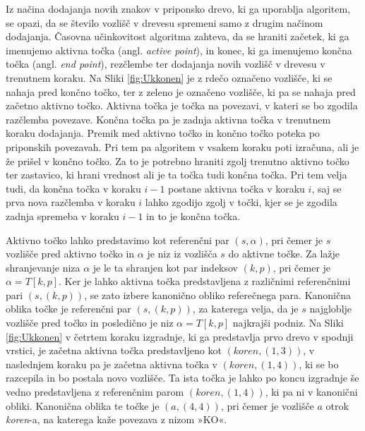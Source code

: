 Iz načina dodajanja novih znakov v priponsko drevo, ki ga uporablja algoritem, se opazi, da se število vozlišč v drevesu spremeni samo z drugim načinom dodajanja. Časovna učinkovitost algoritma zahteva, da se hraniti začetek, ki ga imenujemo aktivna točka (angl. \textit{active point}),  in konec, ki ga imenujemo končna točka (angl. \textit{end point}), rezčlembe ter dodajanja novih vozlišč v drevesu v trenutnem koraku. Na Sliki \ref{fig:Ukkonen} je z rdečo označeno vozlišče, ki se nahaja pred končno točko, ter z zeleno je označeno vozlišče, ki pa se nahaja pred začetno aktivno točko. Aktivna točka je točka na povezavi, v kateri se bo zgodila razčlemba povezave. Končna točka pa je zadnja aktivna točka v trenutnem koraku dodajanja. Premik med aktivno točko in končno točko poteka po priponskih povezavah. Pri tem pa algoritem v vsakem koraku poti izračuna, ali je že prišel v končno točko. Za to je potrebno hraniti zgolj trenutno aktivno točko ter zastavico, ki hrani vrednost ali je ta točka tudi končna točka. Pri tem velja tudi, da končna točka v koraku $i-1$ postane aktivna točka v koraku $i$, saj se prva nova razčlemba v koraku $i$ lahko zgodijo zgolj v točki, kjer se je zgodila zadnja spremeba v koraku $i-1$ in to je končna točka. 

Aktivno točko lahko predstavimo kot referenčni par $(s,\alpha)$, pri čemer je $s$ vozlišče pred aktivno točko in $\alpha$ je niz iz vozlišča $s$ do aktivne točke. Za lažje shranjevanje niza $\alpha$ je le ta shranjen kot par indeksov $(k,p)$, pri čemer je $\alpha=T[k,p]$. Ker je lahko aktivna točka predstavljena z različnimi referenčnimi pari $(s,(k,p))$, se zato izbere kanonično obliko referečnega para. Kanonična oblika točke je referenčni par $(s,(k,p))$, za katerega velja, da je $s$ najgloblje vozlišče pred točko in posledično je niz $\alpha=T[k,p]$ najkrajši podniz. Na Sliki \ref{fig:Ukkonen} v četrtem koraku izgradnje, ki ga predstavlja prvo drevo v spodnji vrstici, je začetna aktivna točka predstavljeno kot $(\textit{koren},(1,3))$, v naslednjem koraku pa je začetna aktivna točka v $(\textit{koren},(1,4))$, ki se bo razcepila in bo postala novo vozlišče. Ta ista točka je lahko po koncu izgradnje še vedno predstavljena z referenčnim parom $(\textit{koren},(1,4))$, ki pa ni v kanonični obliki. Kanonična oblika te točke je $(a,(4,4))$, pri čemer je vozlišče $a$ otrok \textit{koren}-a, na katerega kaže povezava z nizom »KO«.

